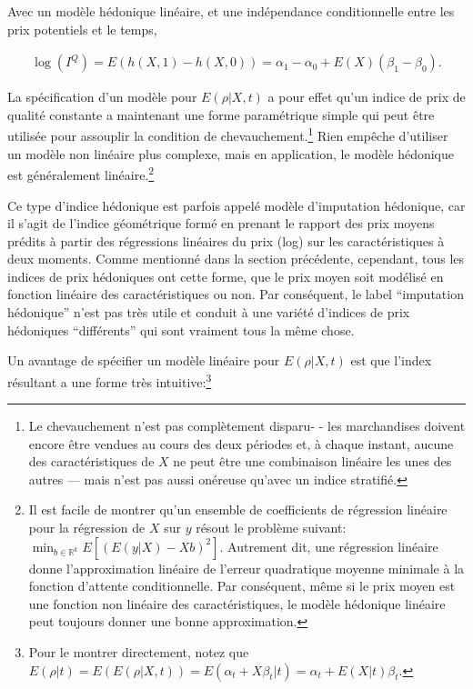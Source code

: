 \documentclass[]{article}
\begin{document}
Avec un modèle hédonique linéaire, et une indépendance conditionnelle entre les prix potentiels et le temps,

\begin{align*}
\log (I^{Q}) = E(h (X, 1) - h (X, 0)) = \alpha_{1} - \alpha_{0} + E(X) (\beta_{1} - \beta_{0}).
\end{align*}

La spécification d'un modèle pour \(E(\rho | X, t)\) a pour effet qu'un indice de prix de qualité constante a maintenant une forme paramétrique simple qui peut être utilisée pour assouplir la condition de chevauchement.\footnote{Le chevauchement n'est pas complètement disparu- - les marchandises doivent encore être vendues au cours des deux périodes et, à chaque instant, aucune des caractéristiques de \(X\) ne peut être une combinaison linéaire les unes des autres --- mais n'est pas aussi onéreuse qu'avec un indice stratifié.} Rien empêche d'utiliser un modèle non linéaire plus complexe, mais en application, le modèle hédonique est généralement linéaire.\footnote{Il est facile de montrer qu'un ensemble de coefficients de régression linéaire pour la régression de \(X\) sur \(y\) résout le problème suivant: \(\min_{b \in \mathbb {R}^{k}} E[(E(y | X) - Xb)^{2}]\). Autrement dit, une régression linéaire donne l'approximation linéaire de l'erreur quadratique moyenne minimale à la fonction d'attente conditionnelle. Par conséquent, même si le prix moyen est une fonction non linéaire des caractéristiques, le modèle hédonique linéaire peut toujours donner une bonne approximation.}

Ce type d'indice hédonique est parfois appelé modèle d'imputation hédonique, car il s'agit de l'indice géométrique formé en prenant le rapport des prix moyens prédits à partir des régressions linéaires du prix (log) sur les caractéristiques à deux moments. Comme mentionné dans la section précédente, cependant, tous les indices de prix hédoniques ont cette forme, que le prix moyen soit modélisé en fonction linéaire des caractéristiques ou non. Par conséquent, le label ``imputation hédonique'' n'est pas très utile et conduit à une variété d'indices de prix hédoniques ``différents'' qui sont vraiment tous la même chose.

Un avantage de spécifier un modèle linéaire pour \(E(\rho | X, t)\) est que l'index résultant a une forme très intuitive:\footnote{Pour le montrer directement, notez que \(E(\rho | t) = E(E(\rho | X, t)) = E(\alpha_{t} + X \beta_{t} | t) = \alpha_{t} + E(X | t) \beta_{t}\).}
\end{document}

